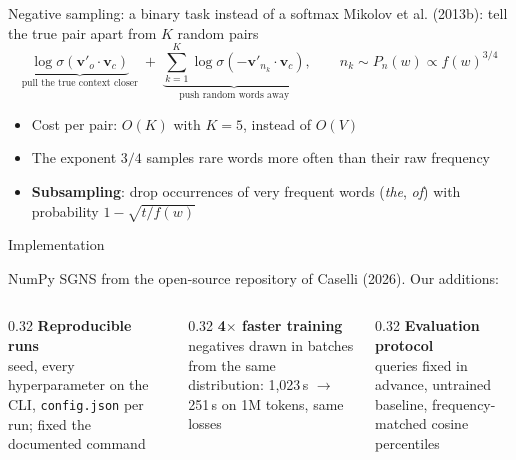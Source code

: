 \documentclass[aspectratio=169,11pt]{beamer}
\newcommand{\muted}[1]{\textcolor{muted}{#1}}
\begin{document}
\begin{frame}{Negative sampling: a binary task instead of a softmax}
    \muted{Mikolov et al. (2013b)}: tell the true pair apart from $K$ random pairs
    \[
        \underbrace{\log \sigma(\mathbf{v}'_o \cdot \mathbf{v}_c)}_{\text{pull the true context closer}}
        \; + \;
        \underbrace{\sum_{k=1}^{K} \log \sigma(-\mathbf{v}'_{n_k} \cdot \mathbf{v}_c)}_{\text{push random words away}},
        \qquad n_k \sim P_n(w) \propto f(w)^{3/4}
    \]
    \begin{itemize}
        \item Cost per pair: $O(K)$ with $K = 5$, instead of $O(V)$
        \item The exponent $3/4$ samples rare words more often than their raw frequency
        \item \textbf{Subsampling}: drop occurrences of very frequent words (\textit{the}, \textit{of}) with probability $1 - \sqrt{t / f(w)}$
    \end{itemize}
\end{frame}

\begin{frame}{Implementation}
    \begin{center}
        \resizebox{\textwidth}{!}{}
    \end{center}
    \small
    \muted{NumPy SGNS from the open-source repository of Caselli (2026). Our additions:}
    \vspace{1mm}
    \begin{columns}[T]
        \begin{column}{0.32\textwidth}
            \textbf{Reproducible runs}\\
            seed, every hyperparameter on the CLI, \texttt{config.json} per run; fixed the documented command
        \end{column}
        \begin{column}{0.32\textwidth}
            \textbf{4$\times$ faster training}\\
            negatives drawn in batches from the same distribution: 1,023\,s $\to$ 251\,s on 1M tokens, same losses
        \end{column}
        \begin{column}{0.32\textwidth}
            \textbf{Evaluation protocol}\\
            queries fixed in advance, untrained baseline, frequency-matched cosine percentiles
        \end{column}
    \end{columns}
\end{frame}
\end{document}
